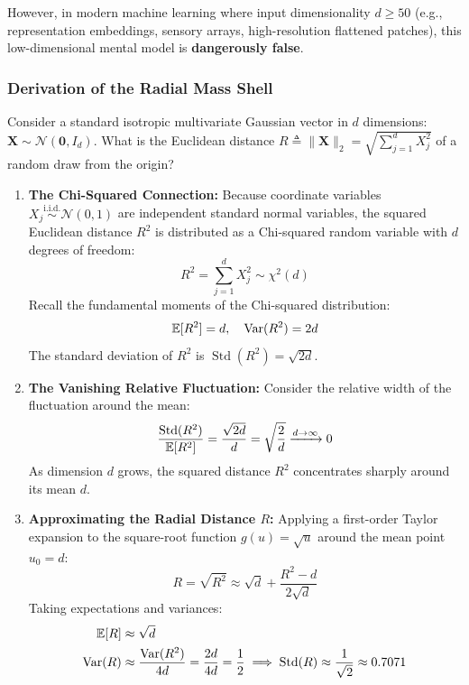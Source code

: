 However, in modern machine learning where input dimensionality $d \ge 50$ (e.g., representation embeddings, sensory arrays, high-resolution flattened patches), this low-dimensional mental model is \textbf{dangerously false}.

\subsubsection{Derivation of the Radial Mass Shell}
Consider a standard isotropic multivariate Gaussian vector in $d$ dimensions: $\mathbf{X} \sim \mathcal{N}(\mathbf{0}, I_d)$. What is the Euclidean distance $R \triangleq \|\mathbf{X}\|_2 = \sqrt{\sum_{j=1}^d X_j^2}$ of a random draw from the origin?

\begin{enumerate}
    \item \textbf{The Chi-Squared Connection:} Because coordinate variables $X_j \stackrel{\text{i.i.d.}}{\sim} \mathcal{N}(0, 1)$ are independent standard normal variables, the squared Euclidean distance $R^2$ is distributed as a Chi-squared random variable with $d$ degrees of freedom:
    \begin{equation}
    R^2 = \sum_{j=1}^d X_j^2 \sim \chi^2(d)
    \end{equation}
    Recall the fundamental moments of the Chi-squared distribution:
    \begin{equation}
    \operatorname{\mathbb{E}}[R^2] = d, \quad \operatorname{Var}(R^2) = 2d
    \end{equation}
    The standard deviation of $R^2$ is $\operatorname{Std}(R^2) = \sqrt{2d}$.

    \item \textbf{The Vanishing Relative Fluctuation:} Consider the relative width of the fluctuation around the mean:
    \begin{equation}
    \frac{\operatorname{Std}(R^2)}{\operatorname{\mathbb{E}}[R^2]} = \frac{\sqrt{2d}}{d} = \sqrt{\frac{2}{d}} \xrightarrow{d \to \infty} 0
    \end{equation}
    As dimension $d$ grows, the squared distance $R^2$ concentrates sharply around its mean $d$.

    \item \textbf{Approximating the Radial Distance $R$:} Applying a first-order Taylor expansion to the square-root function $g(u) = \sqrt{u}$ around the mean point $u_0 = d$:
    \begin{equation}
    R = \sqrt{R^2} \approx \sqrt{d} + \frac{R^2 - d}{2\sqrt{d}}
    \end{equation}
    Taking expectations and variances:
    \begin{align}
    \operatorname{\mathbb{E}}[R] &\approx \sqrt{d} \\
    \operatorname{Var}(R) &\approx \frac{\operatorname{Var}(R^2)}{4d} = \frac{2d}{4d} = \frac{1}{2} \implies \operatorname{Std}(R) \approx \frac{1}{\sqrt{2}} \approx 0.7071
    \end{align}
\end{enumerate}

